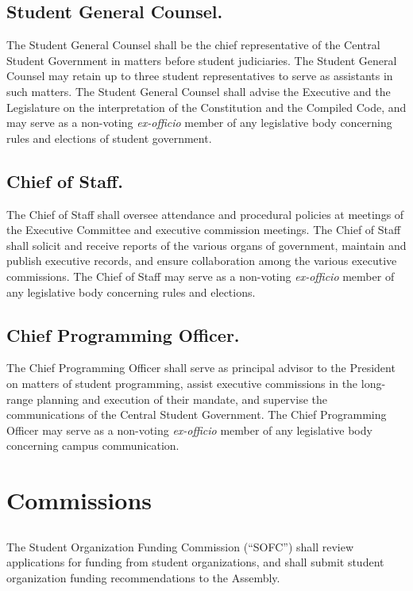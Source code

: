 \subsection{Student General Counsel.}
The Student General Counsel shall be the chief representative of the Central Student Government in matters before student judiciaries. The Student General Counsel may retain up to three student representatives to serve as assistants in such matters. The Student General Counsel shall advise the Executive and the Legislature on the interpretation of the Constitution and the Compiled Code, and may serve as a non-voting \textit{ex-officio} member of any legislative body concerning rules and elections of student government.

\subsection{Chief of Staff.}
The Chief of Staff shall oversee attendance and procedural policies at meetings of the Executive Committee and executive commission meetings. The Chief of Staff shall solicit and receive reports of the various organs of government, maintain and publish executive records, and ensure collaboration among the various executive commissions. The Chief of Staff may serve as a non-voting \textit{ex-officio} member of any legislative body concerning rules and elections.

\subsection{Chief Programming Officer.}
The Chief Programming Officer shall serve as principal advisor to the President on matters of student programming, assist executive commissions in the long-range planning and execution of their mandate, and supervise the communications of the Central Student Government. The Chief Programming Officer may serve as a non-voting \textit{ex-officio} member of any legislative body concerning campus communication.


\section{Commissions}

\subsection{}
The Student Organization Funding Commission (``SOFC'') shall review applications for funding from student organizations, and shall submit student organization funding recommendations to the Assembly.

